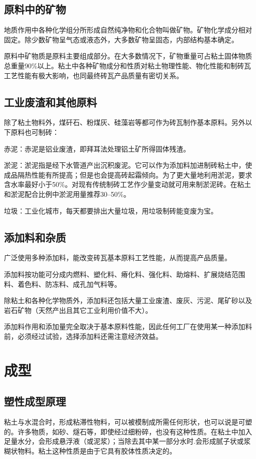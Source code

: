 \documentclass{ctexbook}
\begin{document}
\subsection{原料中的矿物}
地质作用中各种化学组分所形成自然纯净物和化合物叫做矿物。矿物化学成分相对固定。除少数矿物呈气态或液态外，大多数矿物呈固态，内部结构基本确定。

原料中矿物质是原料主要组成部分。在大多数情况下，矿物重量可占粘土固体物质总重量90\%以上。粘土中各种矿物成分和性质对粘土物理性能、物化性能和制砖瓦工艺性能有极大影响，也同最终砖瓦产品质量有密切关系。
\subsection{工业废渣和其他原料}
除了粘土物料外，煤矸石、粉煤灰、硅藻岩等都可作为砖瓦制作基本原料。另外以下原料也可制砖：

赤泥：赤泥是铝业废渣，即拜耳法处理铝土矿所得固体残渣。

淤泥：淤泥指是经下水管道产出沉积废泥。它可以作为添加料加进制砖粘土中，使成品隔热性能有所提高；但是也会提高砖起霜倾向。为了更大量地利用淤泥，要求含水率最好小于50\%。对现有传统制砖工艺作少量变动就可用来制淤泥砖。在粘土和淤泥配合比例中淤泥用量推荐30--50\%。

垃圾：工业化城市，每天都要排出大量垃圾，用垃圾制砖能变废为宝。	
\subsection{添加料和杂质}
广泛使用多种添加料，能改变砖瓦基本原料工艺性能，从而提高产品质量。

添加料按功能可分成内燃料、塑化料、瘠化料、强化料、助熔料、扩展烧结范围料、着色料、防冻料、成孔加气料等。

除粘土和各种化学物质外，添加料还包括大量工业废渣、废灰、污泥、尾矿砂以及岩石矿物（天然产出且其它工业利用价值不大）。

添加料作用和添加量完全取决于基本原料性能，因此任何工厂在使用某一种添加料前，必须经过试验，选择添加料还需注意经济效益。
\section{成型}
\subsection{塑性成型原理}
粘土与水混合时，形成粘滞性物料，可以被模制成所需任何形状，也可以说是可塑的。许多物质，如砂、燧石等，即使经过细粉碎，也没有这种性质。在粘土中加入足量水分，会形成悬浮液（或泥浆）；当除去其中某一部分水时.会形成腻子状或浆糊状物料。粘土这种性质是由于它具有胶体性质决定的。
\end{document}
